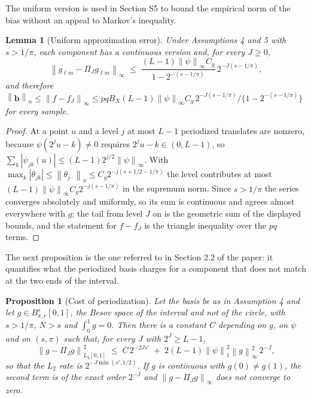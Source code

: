 \documentclass[10pt]{book}
\newtheorem{lemma}{Lemma}[section]
\newtheorem{proposition}{Proposition}[section]
\theoremstyle{definition}
\newcommand{\norm}[1]{\left\lVert #1 \right\rVert}
\newcommand{\normn}[1]{\left\lVert #1 \right\rVert_{n}}
\newcommand{\cv}{\ell}
\newcommand{\md}{m}
\newcommand{\lev}{j}
\newcommand{\tsl}{k}
\newcommand{\gcomp}[2]{g_{#1#2}}
\newcommand{\wav}[2]{\psi_{#1#2}}
\newcommand{\PiJ}{\Pi_{J}}
\newcommand{\Besov}[3]{B^{#1}_{#2,#3}}
\newcommand{\seff}{s'}
\newcommand{\bb}{\mathbf{b}}
\begin{document}
The uniform version is used in Section S5 to bound the empirical norm of the
bias without an appeal to Markov's inequality.

\begin{lemma}[Uniform approximation error]
\label{lem:sup}
Under Assumptions 4 and 5 with $s > 1/\pi$, each component has a continuous
version and, for every $J \ge 0$,
\[
  \norm{\gcomp{\cv}{\md}-\PiJ\gcomp{\cv}{\md}}_{\infty}
  \;\le\; \frac{(L-1)\norm{\psi}_{\infty}C_g}{1-2^{-(s-1/\pi)}}\,
  2^{-J(s-1/\pi)} ,
\]
and therefore
$\normn{\bb} \le \norm{f-f_J}_{\infty} \le pq B_X(L-1)\norm{\psi}_{\infty}
C_g\,2^{-J(s-1/\pi)}/\{1-2^{-(s-1/\pi)}\}$ for every sample.
\end{lemma}

\begin{proof}
At a point $u$ and a level $\lev$ at most $L-1$ periodized translates are
nonzero, because $\psi(2^{\lev}u-\tsl)\ne0$ requires
$2^{\lev}u-\tsl \in (0,L-1)$, so
$\sum_{\tsl}|\wav{\lev}{\tsl}(u)| \le (L-1)2^{\lev/2}\norm{\psi}_{\infty}$.
With $\max_{\tsl}|\theta_{\lev\tsl}| \le \norm{\theta_{\lev\cdot}}_{\pi} \le
C_g2^{-\lev(s+1/2-1/\pi)}$ the level contributes at most
$(L-1)\norm{\psi}_{\infty}C_g2^{-\lev(s-1/\pi)}$ in the supremum norm. Since
$s > 1/\pi$ the series converges absolutely and uniformly, so its sum is
continuous and agrees almost everywhere with $g$; the tail from level $J$ on
is the geometric sum of the displayed bounds, and the statement for $f-f_J$ is
the triangle inequality over the $pq$ terms.
\end{proof}

The next proposition is the one referred to in Section 2.2 of the paper: it
quantifies what the periodized basis charges for a component that does not
match at the two ends of the interval.

\begin{proposition}[Cost of periodization]
\label{prop:periodization}
Let the basis be as in Assumption 4 and let
$g \in \Besov{s}{\pi}{r}[0,1]$, the Besov space of the interval and not of the
circle, with $s > 1/\pi$, $N > s$ and $\int_0^1 g = 0$. Then there is a
constant $C$ depending on $g$, on $\psi$ and on $(s,\pi)$ such that, for every
$J$ with $2^J \ge L-1$,
\[
  \norm{g-\PiJ g}^2_{L_2[0,1]} \;\le\; C\,2^{-2J\seff}
  \;+\; 2(L-1)\norm{\psi}_1^2\norm{g}^2_{\infty}\,2^{-J},
\]
so that the $L_2$ rate is $2^{-J\min(\seff,1/2)}$. If $g$ is continuous with
$g(0) \ne g(1)$, the second term is of the exact order $2^{-J}$ and
$\norm{g-\PiJ g}_{\infty}$ does not converge to zero.
\end{proposition}
\end{document}
